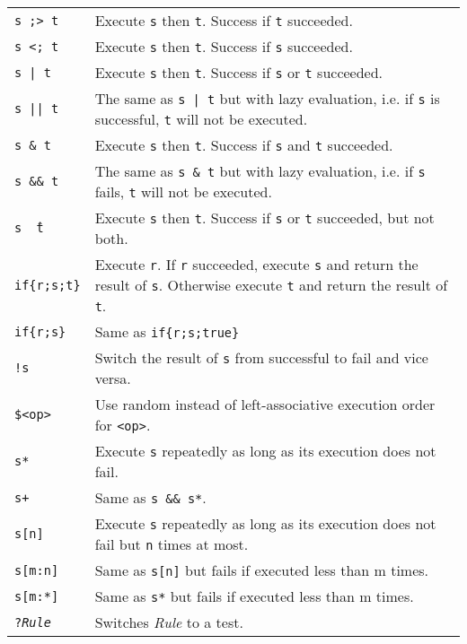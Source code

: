 \begin{table}[htbp]
\begin{minipage}{\linewidth} \renewcommand{\footnoterule}{} 
\begin{tabularx}{\linewidth}{|lX|}
\hline
\texttt{s ;> t}		& Execute \texttt{s} then \texttt{t}. Success if \texttt{t} succeeded.\\
\texttt{s <; t}		& Execute \texttt{s} then \texttt{t}. Success if \texttt{s} succeeded.\\
\texttt{s | t}		& Execute \texttt{s} then \texttt{t}. Success if \texttt{s} or \texttt{t} succeeded.\\
\texttt{s || t}	& The same as \texttt{s | t} but with lazy evaluation, i.e. if \texttt{s} is successful, \texttt{t} will not be executed.\\
\texttt{s \& t}	& Execute \texttt{s} then \texttt{t}. Success if \texttt{s} and \texttt{t} succeeded.\\
\texttt{s \&\& t}	& The same as \texttt{s \& t} but with lazy evaluation, i.e. if \texttt{s} fails, \texttt{t} will not be executed.\\
\texttt{s \^\ t}	& Execute \texttt{s} then \texttt{t}. Success if \texttt{s} or \texttt{t} succeeded, but not both.\\
\texttt{if\{r;s;t\}}	& Execute \texttt{r}. If \texttt{r} succeeded, execute \texttt{s} and return the result of \texttt{s}. Otherwise execute \texttt{t} and return the result of \texttt{t}.\\
\texttt{if\{r;s\}}	& Same as \texttt{if\{r;s;true\}}\\
\texttt{!s}		& Switch the result of \texttt{s} from successful to fail and vice versa.\\
\texttt{\$<op>}	& Use random instead of left-associative execution order for \texttt{<op>}. \\
\texttt{s*}		& Execute \texttt{s} repeatedly as long as its execution does not fail.\\
\texttt{s+}		& Same as \texttt{s \&\& s*}.\\
\texttt{s[n]}	& Execute \texttt{s} repeatedly as long as its execution does not fail but \texttt{n} times at most.\\
\texttt{s[m:n]}	& Same as \texttt{s[n]} but fails if executed less than m times.\\
\texttt{s[m:*]}	& Same as \texttt{s*} but fails if executed less than m times.\\
\texttt{?\emph{Rule}} & Switches \emph{Rule} to a test. \\

\end{tabularx}
\end{minipage}
\end{table}
